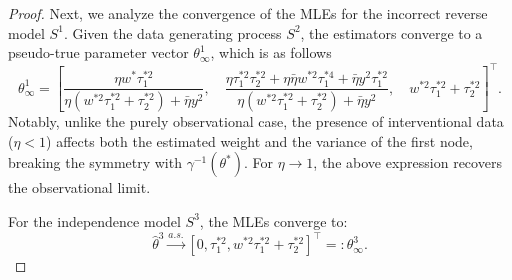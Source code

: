 \documentclass[accepted]{uai2026} %
\def\transpose{\intercal}
\theoremstyle{boldremark}
\begin{document}
\begin{proof}
    Next, we analyze the convergence of the MLEs for the incorrect reverse model $S^1$. Given the data generating process $S^2$, the estimators converge to a pseudo-true parameter vector $\theta_\infty^1$, which is as follows
    \begin{equation}
        \theta_\infty^1 = \left[ 
        \frac{\eta w^*\tau_1^{*2}}{\eta(w^{*2}\tau_1^{*2}+\tau_2^{*2})+\bar{\eta}y^2}, \quad
        \frac{\eta\tau_1^{*2}\tau_2^{*2}+\eta\bar{\eta}w^{*2}\tau_1^{*4}+\bar{\eta}y^2\tau_1^{*2}}{\eta(w^{*2}\tau_1^{*2}+\tau_2^{*2})+\bar{\eta}y^2}, \quad
        w^{*2}\tau_1^{*2}+\tau_2^{*2} 
        \right]^\transpose.
        \label{eq:theta1_limit_under_M2}
    \end{equation}
    Notably, unlike the purely observational case, the presence of interventional data ($\eta < 1$) affects both the estimated weight and the variance of the first node, breaking the symmetry with $\gamma^{-1}(\theta^*)$. For $\eta \to 1$, the above expression recovers the observational limit.

    For the independence model $S^3$, the MLEs converge to:
    \begin{equation}
        \hat{\theta}^3 \xrightarrow{a.s.} [0, \tau_1^{*2}, w^{*2}\tau_1^{*2}+\tau_2^{*2}]^\transpose =: \theta^3_{\infty}.
    \end{equation}


\end{proof}
\end{document}
